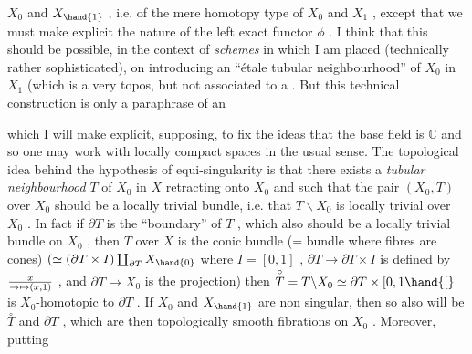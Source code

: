 
$X_0$ and $X_{\hand{1}}$ , i.e. of the mere homotopy type of $X_0$ and $X_1$ , except 
 that we must make explicit the nature of the left exact functor $\phi$ .
I think that this should be possible, in the context of \emph{schemes} in which I
am placed (technically rather sophisticated), on introducing an ``\'etale
tubular neighbourhood'' of $X_0$ in $X_1$ (which is a very  topos, but
not associated to a \hand{)}. But this technical construction is only a
paraphrase of an \hand{,} which I will
make explicit, supposing, to fix the ideas\hand{,} that the base field is $\mathbb{C}$ and so
one may work with locally compact spaces in the usual sense. The topological
idea behind the hypothesis of equi-singularity is that there exists a
\emph{tubular neighbourhood} $T$ of $X_0$ in $X$ retracting onto $X_0$ and such
that the pair $(X_0 , T)$ over $X_0$ should be a locally trivial bundle, i.e.
that $T\backslash X_0$ is locally trivial over $X_0$ . In fact if $\partial T$ is the ``boundary''
of $T$ , which also should be a locally trivial bundle on $X_0$ , then $T$ over
$X$ is the conic bundle (= bundle where fibres are cones) $(\simeq (\partial T \times I) \coprod_{\partial T} X_{\hand{0}}$
\margin{\hand{$\longmapsto$}} where $I = [0, 1]$ , $\partial T \to \partial T \times I$ is defined by $x \over{\to}{\mapsto} (x, 1)$ , and
$\partial T \to X_0$ is the projection) then $\overset{\circ}{T} = T\backslash X_0 \simeq \partial T \times [0, 1\hand{[}$ is $X_0$-homotopic
to $\partial T$ . If $X_0$ and $X_{\hand{1}}$ are non singular, then so also will be $\overset{\circ}{T}$ and $\partial T$ ,
which are then topologically smooth fibrations on $X_0$ . Moreover, putting
